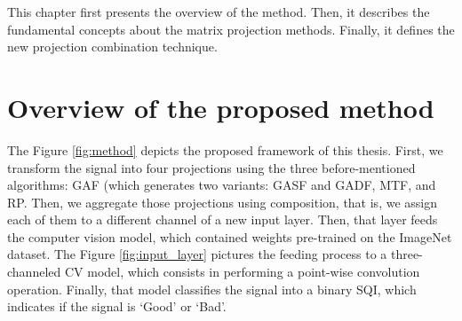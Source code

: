 


This chapter first presents the overview of the method. Then, it describes the fundamental concepts about the matrix projection methods. Finally, it defines the new projection combination technique.

\section{Overview of the proposed method}

The Figure \ref{fig:method} depicts the proposed framework of this thesis. First, we transform the signal into four projections using the three before-mentioned algorithms: \gls{GAF} (which generates two variants: \gls{GASF} and \gls{GADF}, \gls{MTF}, and \gls{RP}. Then, we aggregate those projections using composition, that is, we assign each of them to a different channel of a new input layer. Then, that layer feeds the computer vision model, which contained weights pre-trained on the ImageNet dataset. The Figure \ref{fig:input_layer} pictures the feeding process to a three-channeled \gls{CV} model, which consists in performing a point-wise convolution operation. Finally, that model classifies the signal into a binary \gls{SQI}, which indicates if the signal is `Good' or `Bad'. 

